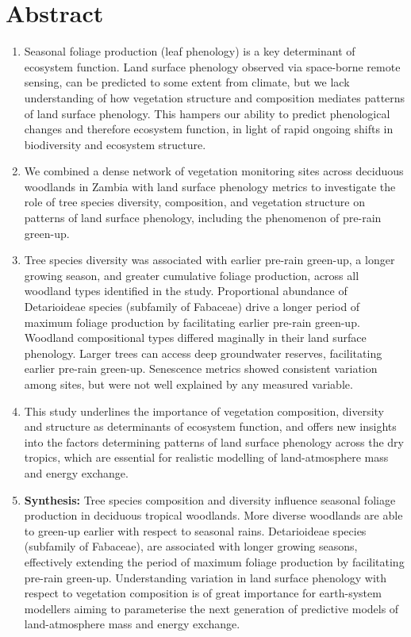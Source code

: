 \documentclass[11pt,a4paper]{article}
\begin{document}
\section*{Abstract}

\begin{enumerate}
	\item{Seasonal foliage production (leaf phenology) is a key determinant of
		ecosystem function. Land surface phenology observed via space-borne
		remote sensing, can be predicted to some extent from climate, but we lack
		understanding of how vegetation structure and composition mediates patterns of
		land surface phenology. This hampers our ability to predict phenological
		changes and therefore ecosystem function, in light of rapid ongoing shifts in
		biodiversity and ecosystem structure.}
		
	\item{We combined a dense network of \nSites{} vegetation monitoring sites
		across deciduous woodlands in Zambia with land surface phenology
		metrics to investigate the role of tree species diversity, composition, and
		vegetation structure on patterns of land surface phenology, including the
		phenomenon of pre-rain green-up.} 

	\item{Tree species diversity was associated with earlier pre-rain green-up,
		a longer growing season, and greater cumulative foliage production,
		across all woodland types identified in the study. Proportional abundance
		of Detarioideae species (subfamily of Fabaceae) drive a longer period of
		maximum foliage production by facilitating earlier pre-rain green-up. Woodland
		compositional types differed maginally in their land surface phenology. Larger
		trees can access deep groundwater reserves, facilitating earlier pre-rain
		green-up. Senescence metrics showed consistent variation among sites, but were
		not well explained by any measured variable.}

	\item{This study underlines the importance of vegetation composition,
		diversity and structure as determinants of ecosystem function, and
		offers new insights into the factors determining patterns of land surface
		phenology across the dry tropics, which are essential for realistic modelling
		of land-atmosphere mass and energy exchange.}

	\item{\textbf{Synthesis:} Tree species composition and diversity influence
		seasonal foliage production in deciduous tropical woodlands. More
		diverse woodlands are able to green-up earlier with respect to seasonal
		rains. Detarioideae species (subfamily of Fabaceae), are associated with longer
		growing seasons, effectively extending the period of maximum foliage production
		by facilitating pre-rain green-up. Understanding variation in land surface
		phenology with respect to vegetation composition is of great importance for
		earth-system modellers aiming to parameterise the next generation of predictive
		models of land-atmosphere mass and energy exchange.}
\end{enumerate}
\end{document}
